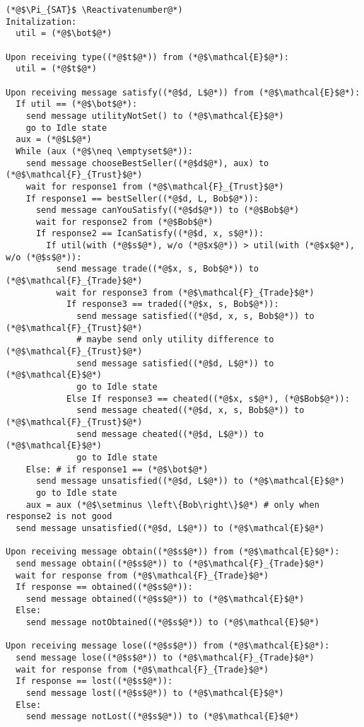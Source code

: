 \Suppressnumber
\begin{lstlisting}[label=satprot, style=numbers]
(*@$\Pi_{SAT}$ \Reactivatenumber@*)
Initalization:
  util = (*@$\bot$@*)

Upon receiving type((*@$t$@*)) from (*@$\mathcal{E}$@*):
  util = (*@$t$@*)

Upon receiving message satisfy((*@$d, L$@*)) from (*@$\mathcal{E}$@*):
  If util == (*@$\bot$@*):
    send message utilityNotSet() to (*@$\mathcal{E}$@*)
    go to Idle state
  aux = (*@$L$@*)
  While (aux (*@$\neq \emptyset$@*)):
    send message chooseBestSeller((*@$d$@*), aux) to (*@$\mathcal{F}_{Trust}$@*)
    wait for response1 from (*@$\mathcal{F}_{Trust}$@*)
    If response1 == bestSeller((*@$d, L, Bob$@*)):
      send message canYouSatisfy((*@$d$@*)) to (*@$Bob$@*)
      wait for response2 from (*@$Bob$@*)
      If response2 == IcanSatisfy((*@$d, x, s$@*)):
        If util(with (*@$s$@*), w/o (*@$x$@*)) > util(with (*@$x$@*), w/o (*@$s$@*)):
          send message trade((*@$x, s, Bob$@*)) to (*@$\mathcal{F}_{Trade}$@*)
          wait for response3 from (*@$\mathcal{F}_{Trade}$@*)
            If response3 == traded((*@$x, s, Bob$@*)):
              send message satisfied((*@$d, x, s, Bob$@*)) to (*@$\mathcal{F}_{Trust}$@*)
              # maybe send only utility difference to (*@$\mathcal{F}_{Trust}$@*)
              send message satisfied((*@$d, L$@*)) to (*@$\mathcal{E}$@*)
              go to Idle state
            Else If response3 == cheated((*@$x, s$@*), (*@$Bob$@*)):
              send message cheated((*@$d, x, s, Bob$@*)) to (*@$\mathcal{F}_{Trust}$@*)
              send message cheated((*@$d, L$@*)) to (*@$\mathcal{E}$@*)
              go to Idle state
    Else: # if response1 == (*@$\bot$@*)
      send message unsatisfied((*@$d, L$@*)) to (*@$\mathcal{E}$@*)
      go to Idle state
    aux = aux (*@$\setminus \left\{Bob\right\}$@*) # only when response2 is not good
  send message unsatisfied((*@$d, L$@*)) to (*@$\mathcal{E}$@*)

Upon receiving message obtain((*@$s$@*)) from (*@$\mathcal{E}$@*):
  send message obtain((*@$s$@*)) to (*@$\mathcal{F}_{Trade}$@*)
  wait for response from (*@$\mathcal{F}_{Trade}$@*)
  If response == obtained((*@$s$@*)):
    send message obtained((*@$s$@*)) to (*@$\mathcal{E}$@*)
  Else:
    send message notObtained((*@$s$@*)) to (*@$\mathcal{E}$@*)

Upon receiving message lose((*@$s$@*)) from (*@$\mathcal{E}$@*):
  send message lose((*@$s$@*)) to (*@$\mathcal{F}_{Trade}$@*)
  wait for response from (*@$\mathcal{F}_{Trade}$@*)
  If response == lost((*@$s$@*)):
    send message lost((*@$s$@*)) to (*@$\mathcal{E}$@*)
  Else:
    send message notLost((*@$s$@*)) to (*@$\mathcal{E}$@*)


\end{lstlisting}
